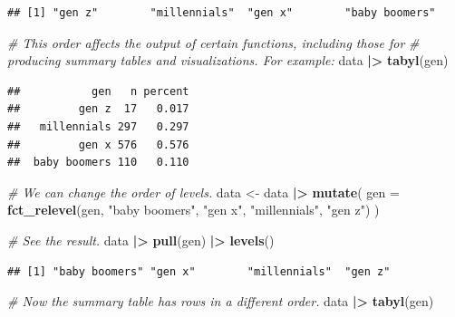 \documentclass[
]{book}
\newenvironment{Shaded}{\begin{snugshade}}{\end{snugshade}}
\newcommand{\AttributeTok}[1]{\textcolor[rgb]{0.13,0.29,0.53}{#1}}
\newcommand{\CommentTok}[1]{\textcolor[rgb]{0.56,0.35,0.01}{\textit{#1}}}
\newcommand{\FunctionTok}[1]{\textcolor[rgb]{0.13,0.29,0.53}{\textbf{#1}}}
\newcommand{\NormalTok}[1]{#1}
\newcommand{\OtherTok}[1]{\textcolor[rgb]{0.56,0.35,0.01}{#1}}
\newcommand{\SpecialCharTok}[1]{\textcolor[rgb]{0.81,0.36,0.00}{\textbf{#1}}}
\newcommand{\StringTok}[1]{\textcolor[rgb]{0.31,0.60,0.02}{#1}}
\begin{document}
\begin{verbatim}
## [1] "gen z"        "millennials"  "gen x"        "baby boomers"
\end{verbatim}

\begin{Shaded}
\begin{Highlighting}[]
\CommentTok{\# This order affects the output of certain functions, including those for }
\CommentTok{\# producing summary tables and visualizations. For example:}
\NormalTok{data }\SpecialCharTok{|\textgreater{}} 
  \FunctionTok{tabyl}\NormalTok{(gen)}
\end{Highlighting}
\end{Shaded}

\begin{verbatim}
##           gen   n percent
##         gen z  17   0.017
##   millennials 297   0.297
##         gen x 576   0.576
##  baby boomers 110   0.110
\end{verbatim}

\begin{Shaded}
\begin{Highlighting}[]
\CommentTok{\# We can change the order of levels.}
\NormalTok{data }\OtherTok{\textless{}{-}}\NormalTok{ data }\SpecialCharTok{|\textgreater{}} 
  \FunctionTok{mutate}\NormalTok{(}
    \AttributeTok{gen =} \FunctionTok{fct\_relevel}\NormalTok{(gen, }\StringTok{"baby boomers"}\NormalTok{, }\StringTok{"gen x"}\NormalTok{, }\StringTok{"millennials"}\NormalTok{, }\StringTok{"gen z"}\NormalTok{)}
\NormalTok{  )}

\CommentTok{\# See the result.}
\NormalTok{data }\SpecialCharTok{|\textgreater{}} 
  \FunctionTok{pull}\NormalTok{(gen) }\SpecialCharTok{|\textgreater{}} 
  \FunctionTok{levels}\NormalTok{()}
\end{Highlighting}
\end{Shaded}

\begin{verbatim}
## [1] "baby boomers" "gen x"        "millennials"  "gen z"
\end{verbatim}

\begin{Shaded}
\begin{Highlighting}[]
\CommentTok{\# Now the summary table has rows in a different order.}
\NormalTok{data }\SpecialCharTok{|\textgreater{}} 
  \FunctionTok{tabyl}\NormalTok{(gen)}
\end{Highlighting}
\end{Shaded}
\end{document}
